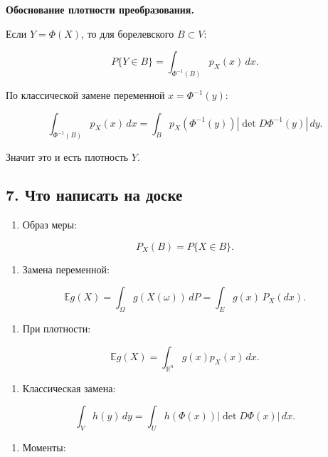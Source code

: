 \documentclass[
  11pt,
  a4paper,
]{article}
\providecommand{\tightlist}{%
  \setlength{\itemsep}{0pt}\setlength{\parskip}{0pt}}
\begin{document}
\textbf{Обоснование плотности преобразования.}

Если \(Y=\Phi(X)\), то для борелевского \(B\subset V\):

\[
P\{Y\in B\}
=
\int_{\Phi^{-1}(B)}p_X(x)\,dx.
\]

По классической замене переменной \(x=\Phi^{-1}(y)\):

\[
\int_{\Phi^{-1}(B)}p_X(x)\,dx
=
\int_B p_X(\Phi^{-1}(y))
\left|\det D\Phi^{-1}(y)\right|\,dy.
\]

Значит это и есть плотность \(Y\).

\subsection{7. Что написать на
доске}\label{ux447ux442ux43e-ux43dux430ux43fux438ux441ux430ux442ux44c-ux43dux430-ux434ux43eux441ux43aux435}

\begin{enumerate}
\def\labelenumi{\arabic{enumi}.}
\tightlist
\item
  Образ меры:
\end{enumerate}

\[
P_X(B)=P\{X\in B\}.
\]

\begin{enumerate}
\def\labelenumi{\arabic{enumi}.}
\setcounter{enumi}{1}
\tightlist
\item
  Замена переменной:
\end{enumerate}

\[
\mathbb E g(X)
=
\int_\Omega g(X(\omega))\,dP
=
\int_E g(x)\,P_X(dx).
\]

\begin{enumerate}
\def\labelenumi{\arabic{enumi}.}
\setcounter{enumi}{2}
\tightlist
\item
  При плотности:
\end{enumerate}

\[
\mathbb E g(X)
=
\int_{\mathbb R^n}g(x)p_X(x)\,dx.
\]

\begin{enumerate}
\def\labelenumi{\arabic{enumi}.}
\setcounter{enumi}{3}
\tightlist
\item
  Классическая замена:
\end{enumerate}

\[
\int_V h(y)\,dy
=
\int_U h(\Phi(x))|\det D\Phi(x)|\,dx.
\]

\begin{enumerate}
\def\labelenumi{\arabic{enumi}.}
\setcounter{enumi}{4}
\tightlist
\item
  Моменты:
\end{enumerate}
\end{document}
